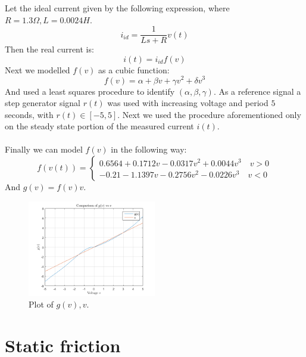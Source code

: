 Let the ideal current given by the following expression, where $R=1.3 \Omega, L=0.0024 H$.
\begin{equation}
i_{id}=\frac{1}{Ls+R} v(t)
\end{equation}
Then the real current is:
\begin{equation}
i(t)=  i_{id} f(v)
\end{equation}
Next we modelled $f(v)$ as a cubic function:
\begin{equation}
f(v) = \alpha+\beta v + \gamma v^2+\delta v^3
\end{equation}
And used a least squares procedure to identify $(\alpha, \beta, \gamma)$.
As a reference signal a step generator signal $r(t)$ was used with increasing voltage and period $5$ seconds, with $r(t) \in [-5,5]$. Next we used the procedure aforementioned only on the steady state portion  of the  measured current $i(t)$.\\ \\
Finally we can model $f(v)$ in the following way:
\begin{equation}
f(v(t)) = \begin{cases}
0.6564+0.1712v-0.0317v^2+0.0044v^3 \quad v>0 \\
-0.21-1.1397v-0.2756v^2-0.0226v^3 \quad v< 0
\end{cases}
\end{equation}
And $g(v) =f(v)v$.
  \begin{figure}[!h]
  \centering
  \includegraphics[width=0.5\textwidth]{img/nonlinear_gain.png}
  \caption{Plot of $g(v),v$.}
\end{figure}
\section{Static friction}
